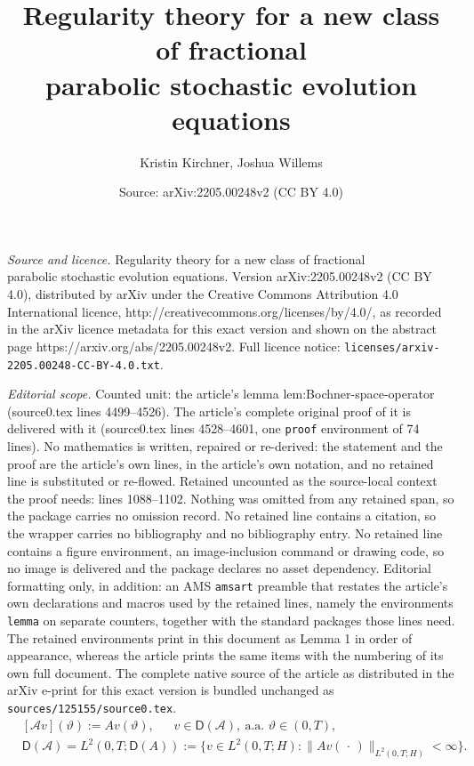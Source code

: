 \documentclass[10pt,a4paper]{amsart}
\title{Regularity theory for a new class of fractional \\ parabolic stochastic evolution equations}
\author{Kristin Kirchner, Joshua Willems}
\date{Source: arXiv:2205.00248v2 (CC BY 4.0)}
\newcommand{\cA}{\mathcal{A}}
\newcommand{\norm}[2]{     \| #1       \|_{ #2 }}
\begin{document}
\maketitle

\noindent\emph{Source and licence.} Regularity theory for a new class of fractional \\ parabolic stochastic evolution equations. Version arXiv:2205.00248v2 (CC BY 4.0), distributed by arXiv under the Creative Commons Attribution 4.0 International licence, http://creativecommons.org/licenses/by/4.0/, as recorded in the arXiv licence metadata for this exact version and shown on the abstract page https://arxiv.org/abs/2205.00248v2. Full licence notice: \texttt{licenses/arxiv-2205.00248-CC-BY-4.0.txt}.\par\smallskip

\noindent\textit{Editorial scope.} Counted unit: the article's lemma lem:Bochner-space-operator (source0.tex lines 4499--4526). The article's complete original proof of it is delivered with it (source0.tex lines 4528--4601, one \texttt{proof} environment of 74 lines). No mathematics is written, repaired or re-derived: the statement and the proof are the article's own lines, in the article's own notation, and no retained line is substituted or re-flowed.  Retained uncounted as the source-local context the proof needs: lines 1088--1102.  Nothing was omitted from any retained span, so the package carries no omission record.  No retained line contains a citation, so the wrapper carries no bibliography and no bibliography entry.  No retained line contains a figure environment, an image-inclusion command or drawing code, so no image is delivered and the package declares no asset dependency.  Editorial formatting only, in addition: an AMS \texttt{amsart} preamble that restates the article's own declarations and macros used by the retained lines, namely the environments \texttt{lemma} on separate counters, together with the standard packages those lines need.  The retained environments print in this document as Lemma 1 in order of appearance, whereas the article prints the same items with the numbering of its own full document.  The complete native source of the article as distributed in the arXiv e-print for this exact version is bundled unchanged as \texttt{sources/125155/source0.tex}.
\begin{equation}\label{eq:def-cA} 
\begin{split}
&[\cA v](\vartheta)
:= Av(\vartheta), 
\quad\;\; 
v \in \mathsf D(\cA), 
\ 
\text{a.a.\ }\vartheta\in (0,T), 
\\
&\mathsf D(\cA) 
= L^2(0,T;\mathsf D(A)) 
:= 
\bigl\{ v \in L^2(0,T;H): \norm{ Av(\,\cdot\,)}{L^2(0,T;H)} < \infty \bigr\}.   
\end{split}
\end{equation}
\end{document}
